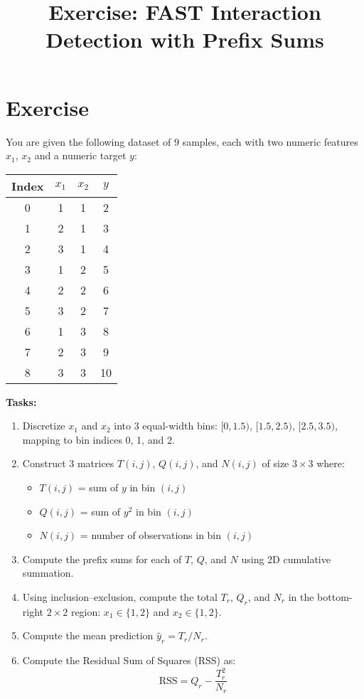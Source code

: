 \documentclass{article}
\title{Exercise: FAST Interaction Detection with Prefix Sums}
\date{}
\begin{document}
\maketitle

\section*{Exercise}
You are given the following dataset of 9 samples, each with two numeric features $x_1$, $x_2$ and a numeric target $y$:

\begin{center}
\begin{tabular}{cccc}
\toprule
Index & $x_1$ & $x_2$ & $y$ \\
\midrule
0 & 1 & 1 & 2 \\
1 & 2 & 1 & 3 \\
2 & 3 & 1 & 4 \\
3 & 1 & 2 & 5 \\
4 & 2 & 2 & 6 \\
5 & 3 & 2 & 7 \\
6 & 1 & 3 & 8 \\
7 & 2 & 3 & 9 \\
8 & 3 & 3 & 10 \\
\bottomrule
\end{tabular}
\end{center}

\bigskip

\textbf{Tasks:}
\begin{enumerate}
    \item Discretize $x_1$ and $x_2$ into 3 equal-width bins: $[0,1.5)$, $[1.5,2.5)$, $[2.5,3.5)$, mapping to bin indices 0, 1, and 2.

    \item Construct 3 matrices $T(i,j)$, $Q(i,j)$, and $N(i,j)$ of size $3 \times 3$ where:
    \begin{itemize}
        \item $T(i,j)$ = sum of $y$ in bin $(i,j)$
        \item $Q(i,j)$ = sum of $y^2$ in bin $(i,j)$
        \item $N(i,j)$ = number of observations in bin $(i,j)$
    \end{itemize}

    \item Compute the prefix sums for each of $T$, $Q$, and $N$ using 2D cumulative summation.

    \item Using inclusion--exclusion, compute the total $T_r$, $Q_r$, and $N_r$ in the bottom-right $2 \times 2$ region: $x_1 \in \{1,2\}$ and $x_2 \in \{1,2\}$.

    \item Compute the mean prediction $\hat{y}_r = T_r / N_r$.

    \item Compute the Residual Sum of Squares (RSS) as:
    \[
    \text{RSS} = Q_r - \frac{T_r^2}{N_r}
    \]
\end{enumerate}
\end{document}
